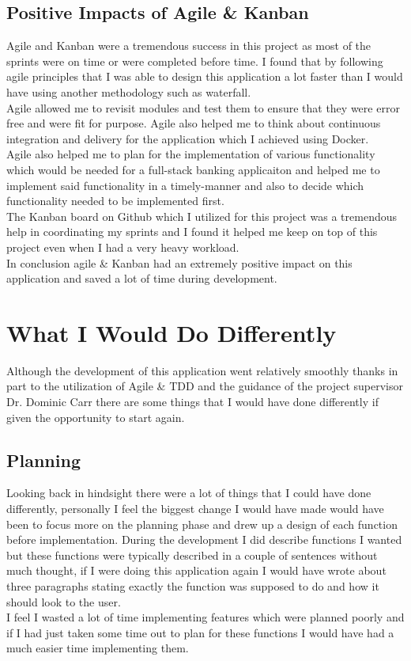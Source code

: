 \subsection{Positive Impacts of Agile \& Kanban}
Agile and Kanban were a tremendous success in this project as most of the sprints were on time or were completed before time.  I found that by following agile principles that I was able to design this application a lot faster than I would have using another methodology such as waterfall.
\\
Agile allowed me to revisit modules and test them to ensure that they were error free and were fit for purpose.  Agile also helped me to think about continuous integration and delivery for the application which I achieved using Docker.
\\
Agile also helped me to plan for the implementation of various functionality which would be needed for a full-stack banking applicaiton and helped me to implement said functionality in a timely-manner and also to decide which functionality needed to be implemented first.
\\
The Kanban board on Github which I utilized for this project was a tremendous help in coordinating my sprints and I found it helped me keep on top of this project even when I had a very heavy workload.
\\
In conclusion agile \& Kanban had an extremely positive impact on this application and saved a lot of time during development.
\section{What I Would Do Differently}
Although the development of this application went relatively smoothly thanks in part to the utilization of Agile \& TDD and the guidance of the project supervisor Dr. Dominic Carr there are some things that I would have done differently if given the opportunity to start again.
\subsection{Planning}
Looking back in hindsight there were a lot of things that I could have done differently, personally I feel the biggest change I would have made would have been to focus more on the planning phase and drew up a design of each function before implementation.  During the development I did describe functions I wanted but these functions were typically described in a couple of sentences without much thought, if I were doing this application again I would have wrote about three paragraphs stating exactly the function was supposed to do and how it should look to the user.
\\
I feel I wasted a lot of time implementing features which were planned poorly and if I had just taken some time out to plan for these functions I would have had a much easier time implementing them.
